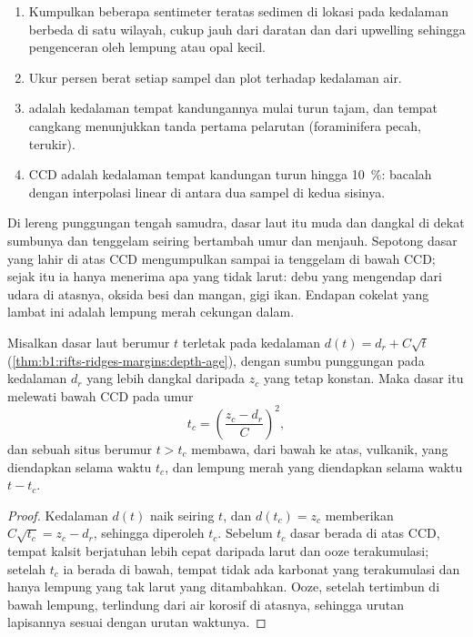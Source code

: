\begin{method}\label{met:b1:chemical-biogenic-sediments:ccd}
\begin{enumerate}
  \item Kumpulkan beberapa sentimeter teratas sedimen di lokasi pada kedalaman berbeda di satu wilayah, cukup jauh dari daratan dan dari upwelling sehingga pengenceran oleh lempung atau opal kecil.
  \item Ukur persen berat  setiap sampel dan plot terhadap kedalaman air.
  \item {} adalah kedalaman tempat kandungannya mulai turun tajam, dan tempat cangkang menunjukkan tanda pertama pelarutan (foraminifera pecah, terukir).
  \item CCD adalah kedalaman tempat kandungan turun hingga \qty{10}{\%}: bacalah dengan interpolasi linear di antara dua sampel di kedua sisinya.
\end{enumerate}
\end{method}

Di lereng punggungan tengah samudra, dasar laut itu muda dan dangkal di dekat sumbunya dan tenggelam seiring bertambah umur dan menjauh. Sepotong dasar yang lahir di atas CCD mengumpulkan  sampai ia tenggelam di bawah CCD; sejak itu ia hanya menerima apa yang tidak larut: debu yang mengendap dari udara di atasnya, oksida besi dan mangan, gigi ikan. Endapan cokelat yang lambat ini adalah lempung merah cekungan dalam.

\begin{proposition}\label{prop:b1:chemical-biogenic-sediments:flank}
Misalkan dasar laut berumur $t$ terletak pada kedalaman $d(t) = d_r + C\sqrt t$ (\cref{thm:b1:rifts-ridges-margins:depth-age}), dengan sumbu punggungan pada kedalaman $d_r$ yang lebih dangkal daripada  $z_c$ yang tetap konstan. Maka dasar itu melewati bawah CCD pada umur
\[
t_c = \left(\frac{z_c - d_r}{C}\right)^2 ,
\]
dan sebuah situs berumur $t > t_c$ membawa, dari bawah ke atas,  vulkanik,  yang diendapkan selama waktu $t_c$, dan lempung merah yang diendapkan selama waktu $t - t_c$.
\end{proposition}

\begin{proof}
Kedalaman $d(t)$ naik seiring $t$, dan $d(t_c) = z_c$ memberikan $C\sqrt{t_c} =
z_c - d_r$, sehingga diperoleh $t_c$. Sebelum $t_c$ dasar berada di atas CCD, tempat kalsit berjatuhan lebih cepat daripada larut dan ooze terakumulasi; setelah $t_c$ ia berada di bawah, tempat tidak ada karbonat yang terakumulasi dan hanya lempung yang tak larut yang ditambahkan. Ooze, setelah tertimbun di bawah lempung, terlindung dari air korosif di atasnya, sehingga urutan lapisannya sesuai dengan urutan waktunya.
\end{proof}

